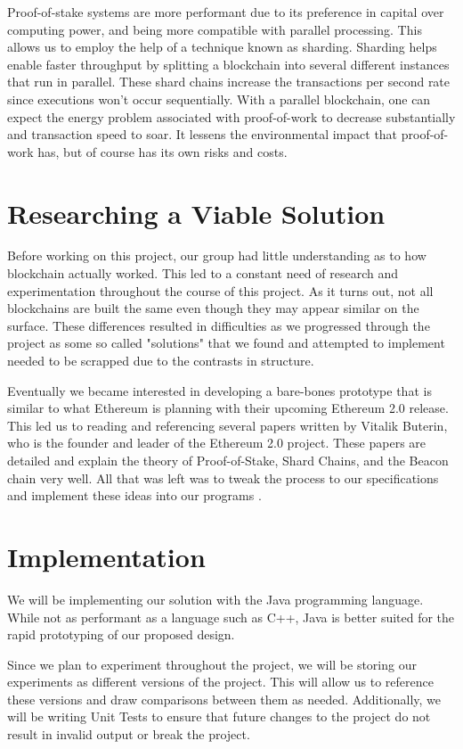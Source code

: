 Proof-of-stake systems are more performant due to its preference in capital over computing power, and being more compatible with parallel processing. This allows us to employ the help of a technique known as sharding. Sharding helps enable faster throughput by splitting a blockchain into several different instances that run in parallel. These shard chains increase the transactions per second rate since executions won’t occur sequentially. With a parallel blockchain, one can expect the energy problem associated with proof-of-work to decrease substantially and transaction speed to soar. It lessens the environmental impact that proof-of-work has, but of course has its own risks and costs.

\section{Researching a Viable Solution}

Before working on this project, our group had little understanding as to how blockchain actually worked. This led to a constant need of research and experimentation throughout the course of this project. As it turns out, not all blockchains are built the same even though they may appear similar on the surface. These differences resulted in difficulties as we progressed through the project as some so called "solutions" that we found and attempted to implement needed to be scrapped due to the contrasts in structure.

Eventually we became interested in developing a bare-bones prototype that is similar to what Ethereum is planning with their upcoming Ethereum 2.0 release. This led us to reading and referencing several papers written by Vitalik Buterin, who is the founder and leader of the Ethereum 2.0 project. These papers are detailed and explain the theory of Proof-of-Stake, Shard Chains, and the Beacon chain very well. All that was left was to tweak the process to our specifications and implement these ideas into our programs \cite{vitaliks}.

\section{Implementation}

We will be implementing our solution with the Java programming language. While not as performant as a language such as C++, Java is better suited for the rapid prototyping of our proposed design.

Since we plan to experiment throughout the project, we will be storing our experiments as different versions of the project. This will allow us to reference these versions and draw comparisons between them as needed.
Additionally, we will be writing Unit Tests to ensure that future changes to the project do not result in invalid output or break the project.

